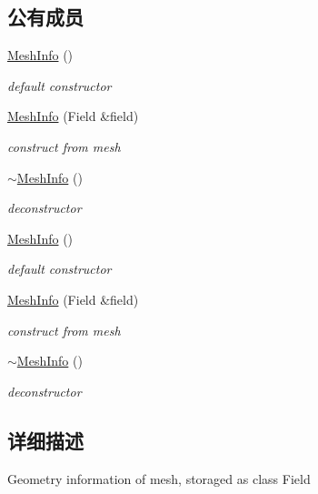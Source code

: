 \subsection*{公有成员}
\begin{DoxyCompactItemize}
\item 
\hyperlink{classMeshInfo_aef70a30d8c1810d076466ad91b3d6e53}{MeshInfo} ()
\begin{DoxyCompactList}\small\item\em default constructor \item\end{DoxyCompactList}\item 
\hyperlink{classMeshInfo_a3c1bd0006d1c4173df6b14b60d5a0cd0}{MeshInfo} (Field \&field)
\begin{DoxyCompactList}\small\item\em construct from mesh \item\end{DoxyCompactList}\item 
\hyperlink{classMeshInfo_a0c6b7e15ff450757e92402f80e93ede6}{$\sim$MeshInfo} ()
\begin{DoxyCompactList}\small\item\em deconstructor \item\end{DoxyCompactList}\item 
\hyperlink{classMeshInfo_aef70a30d8c1810d076466ad91b3d6e53}{MeshInfo} ()
\begin{DoxyCompactList}\small\item\em default constructor \item\end{DoxyCompactList}\item 
\hyperlink{classMeshInfo_a3c1bd0006d1c4173df6b14b60d5a0cd0}{MeshInfo} (Field \&field)
\begin{DoxyCompactList}\small\item\em construct from mesh \item\end{DoxyCompactList}\item 
\hyperlink{classMeshInfo_a0c6b7e15ff450757e92402f80e93ede6}{$\sim$MeshInfo} ()
\begin{DoxyCompactList}\small\item\em deconstructor \item\end{DoxyCompactList}\end{DoxyCompactItemize}


\subsection{详细描述}
Geometry information of mesh, storaged as class Field 

